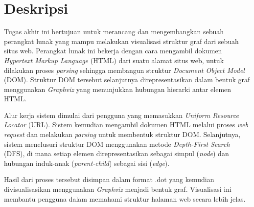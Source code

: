 \documentclass[a4paper,twoside]{article}
\begin{document}
	
	\title{\@judultopik}
	\author{\nama \textendash \@npm} 
	
	\newcommand{\nama}{Bram Matthew Pasaribu}
	\newcommand{\@npm}{6182101043}
	\newcommand{\@judultopik}{Perangkat Lunak Pembuat Visualisasi Graf Situs Web} %
	\newcommand{\jumpemb}{1} %
	\newcommand{\tanggal}{18/02/2026}
	
	
	\maketitle
	
	
	\section{Deskripsi}
	Tugas akhir ini bertujuan untuk merancang dan mengembangkan sebuah perangkat lunak yang mampu melakukan visualisasi struktur graf dari sebuah situs web. Perangkat lunak ini bekerja dengan cara mengambil dokumen \textit{Hypertext Markup Language} (HTML) dari suatu alamat situs web, untuk dilakukan proses \textit{parsing} sehingga membangun struktur \textit{Document Object Model} (DOM). Struktur DOM tersebut selanjutnya direpresentasikan dalam bentuk graf menggunakan \textit{Graphviz} yang menunjukkan hubungan hierarki antar elemen HTML.

    Alur kerja sistem dimulai dari pengguna yang memasukkan \textit{Uniform Resource Locator} (URL). Sistem kemudian mengambil dokumen HTML melalui proses \textit{web request} dan melakukan \textit{parsing} untuk membentuk struktur DOM. Selanjutnya, sistem menelusuri struktur DOM menggunakan metode \textit{Depth-First Search} (DFS), di mana setiap elemen direpresentasikan sebagai simpul (\textit{node}) dan hubungan induk-anak (\textit{parent-child}) sebagai sisi (\textit{edge}).
    
    Hasil dari proses tersebut disimpan dalam format .dot yang kemudian divisualisasikan menggunakan \textit{Graphviz} menjadi bentuk graf. Visualisasi ini membantu pengguna dalam memahami struktur halaman web secara lebih jelas.
	
\end{document}
